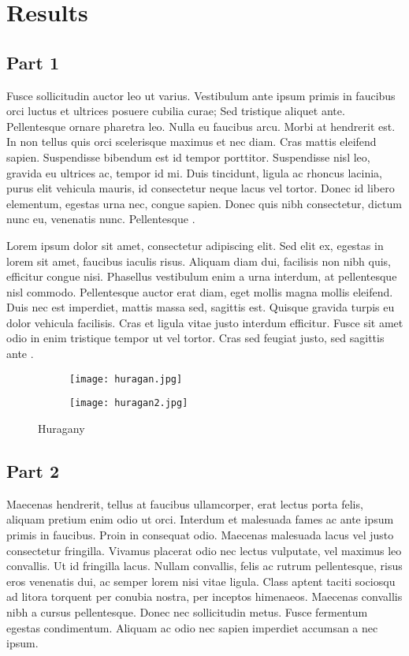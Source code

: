 \documentclass[a4paper, 12pt]{article}
\begin{document}
\newpage

\section{Results}
\subsection{Part 1}
Fusce sollicitudin auctor leo ut varius. Vestibulum ante ipsum primis in faucibus orci luctus et ultrices posuere cubilia curae; Sed tristique aliquet ante. Pellentesque ornare pharetra leo. Nulla eu faucibus arcu. Morbi at hendrerit est. In non tellus quis orci scelerisque maximus et nec diam. Cras mattis eleifend sapien. Suspendisse bibendum est id tempor porttitor. Suspendisse nisl leo, gravida eu ultrices ac, tempor id mi. Duis tincidunt, ligula ac rhoncus lacinia, purus elit vehicula mauris, id consectetur neque lacus vel tortor. Donec id libero elementum, egestas urna nec, congue sapien. Donec quis nibh consectetur, dictum nunc eu, venenatis nunc. Pellentesque \cite{schooler2011unpublished}.

Lorem ipsum dolor sit amet, consectetur adipiscing elit. Sed elit ex, egestas in lorem sit amet, faucibus iaculis risus. Aliquam diam dui, facilisis non nibh quis, efficitur congue nisi. Phasellus vestibulum enim a urna interdum, at pellentesque nisl commodo. Pellentesque auctor erat diam, eget mollis magna mollis eleifend. Duis nec est imperdiet, mattis massa sed, sagittis est. Quisque gravida turpis eu dolor vehicula facilisis. Cras et ligula vitae justo interdum efficitur. Fusce sit amet odio in enim tristique tempor ut vel tortor. Cras sed feugiat justo, sed sagittis ante \cite{ripley2011manual}.

\begin{figure}[!t]
	\centering
	\begin{subfigure}[b]{0.45\textwidth}
		\centering
		\texttt{[image: huragan.jpg]}
		\caption{}
		\label{fig:img-1}
	\end{subfigure}
	\hfill
	\begin{subfigure}[b]{0.45\textwidth}
		\centering
		\texttt{[image: huragan2.jpg]}
		\caption{}
		\label{fig:img-1}
	\end{subfigure}
	\caption{Huragany}
	\label{fig:two-figs}
\end{figure}
\subsection{Part 2}
Maecenas hendrerit, tellus at faucibus ullamcorper, erat lectus porta felis, aliquam pretium enim odio ut orci. Interdum et malesuada fames ac ante ipsum primis in faucibus. Proin in consequat odio. Maecenas malesuada lacus vel justo consectetur fringilla. Vivamus placerat odio nec lectus vulputate, vel maximus leo convallis. Ut id fringilla lacus. Nullam convallis, felis ac rutrum pellentesque, risus eros venenatis dui, ac semper lorem nisi vitae ligula. Class aptent taciti sociosqu ad litora torquent per conubia nostra, per inceptos himenaeos. Maecenas convallis nibh a cursus pellentesque. Donec nec sollicitudin metus. Fusce fermentum egestas condimentum. Aliquam ac odio nec sapien imperdiet accumsan a nec ipsum.
\end{document}
